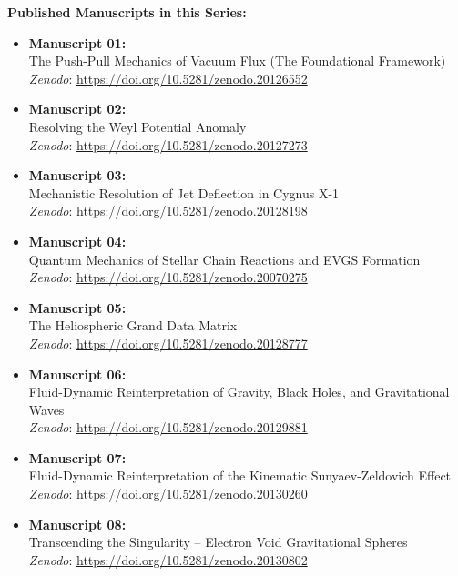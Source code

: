 \documentclass[11pt, a4paper, table]{article}
\begin{document}
  \vspace{1em}
  \noindent \textbf{Published Manuscripts in this Series:}
  \begin{itemize}
    \item \textbf{Manuscript 01:} \\ The Push-Pull Mechanics of Vacuum Flux (The Foundational Framework) \\ \textit{Zenodo}: \url{https://doi.org/10.5281/zenodo.20126552}
    
    \item \textbf{Manuscript 02:} \\ Resolving the Weyl Potential Anomaly \\ \textit{Zenodo}: \url{https://doi.org/10.5281/zenodo.20127273}

    \item \textbf{Manuscript 03:} \\ Mechanistic Resolution of Jet Deflection in Cygnus X-1 \\ \textit{Zenodo}: \url{https://doi.org/10.5281/zenodo.20128198}

    \item \textbf{Manuscript 04:} \\ Quantum Mechanics of Stellar Chain Reactions and EVGS Formation \\ \textit{Zenodo}: \url{https://doi.org/10.5281/zenodo.20070275}

    \item \textbf{Manuscript 05:} \\ The Heliospheric Grand Data Matrix \\ \textit{Zenodo}: \url{https://doi.org/10.5281/zenodo.20128777}

    \item \textbf{Manuscript 06:} \\ Fluid-Dynamic Reinterpretation of Gravity, Black Holes, and Gravitational Waves \\ \textit{Zenodo}: \url{https://doi.org/10.5281/zenodo.20129881}

    \item \textbf{Manuscript 07:} \\ Fluid-Dynamic Reinterpretation of the Kinematic Sunyaev-Zeldovich Effect \\ \textit{Zenodo}: \url{https://doi.org/10.5281/zenodo.20130260}

    \item \textbf{Manuscript 08:} \\ Transcending the Singularity -- Electron Void Gravitational Spheres \\ \textit{Zenodo}: \url{https://doi.org/10.5281/zenodo.20130802}


\end{itemize}
\end{document}
